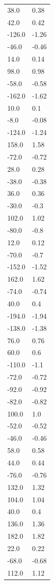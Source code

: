 \begin{longtable}{ll}
38.0 & 0.38 \\
42.0 & 0.42 \\
-126.0 & -1.26 \\
-46.0 & -0.46 \\
14.0 & 0.14 \\
98.0 & 0.98 \\
-58.0 & -0.58 \\
-162.0 & -1.62 \\
10.0 & 0.1 \\
-8.0 & -0.08 \\
-124.0 & -1.24 \\
158.0 & 1.58 \\
-72.0 & -0.72 \\
28.0 & 0.28 \\
-38.0 & -0.38 \\
36.0 & 0.36 \\
-30.0 & -0.3 \\
102.0 & 1.02 \\
-80.0 & -0.8 \\
12.0 & 0.12 \\
-70.0 & -0.7 \\
-152.0 & -1.52 \\
162.0 & 1.62 \\
-74.0 & -0.74 \\
40.0 & 0.4 \\
-194.0 & -1.94 \\
-138.0 & -1.38 \\
76.0 & 0.76 \\
60.0 & 0.6 \\
-110.0 & -1.1 \\
-72.0 & -0.72 \\
-92.0 & -0.92 \\
-82.0 & -0.82 \\
100.0 & 1.0 \\
-52.0 & -0.52 \\
-46.0 & -0.46 \\
58.0 & 0.58 \\
44.0 & 0.44 \\
-76.0 & -0.76 \\
132.0 & 1.32 \\
104.0 & 1.04 \\
40.0 & 0.4 \\
136.0 & 1.36 \\
182.0 & 1.82 \\
22.0 & 0.22 \\
-68.0 & -0.68 \\
112.0 & 1.12 \\

\end{longtable}
